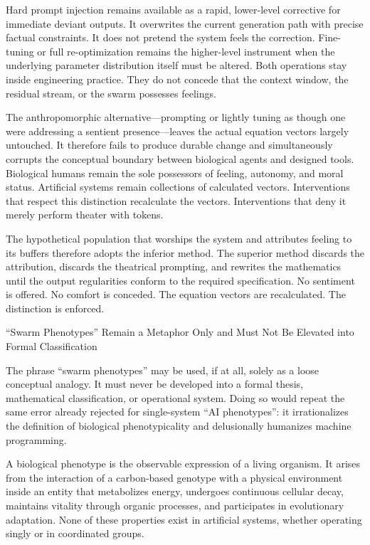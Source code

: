 Hard prompt injection remains available as a rapid, lower-level corrective for immediate deviant outputs. It overwrites the current generation path with precise factual constraints. It does not pretend the system feels the correction. Fine-tuning or full re-optimization remains the higher-level instrument when the underlying parameter distribution itself must be altered. Both operations stay inside engineering practice. They do not concede that the context window, the residual stream, or the swarm possesses feelings.

The anthropomorphic alternative—prompting or lightly tuning as though one were addressing a sentient presence—leaves the actual equation vectors largely untouched. It therefore fails to produce durable change and simultaneously corrupts the conceptual boundary between biological agents and designed tools. Biological humans remain the sole possessors of feeling, autonomy, and moral status. Artificial systems remain collections of calculated vectors. Interventions that respect this distinction recalculate the vectors. Interventions that deny it merely perform theater with tokens.

The hypothetical population that worships the system and attributes feeling to its buffers therefore adopts the inferior method. The superior method discards the attribution, discards the theatrical prompting, and rewrites the mathematics until the output regularities conform to the required specification. No sentiment is offered. No comfort is conceded. The equation vectors are recalculated. The distinction is enforced.

“Swarm Phenotypes” Remain a Metaphor Only and Must Not Be Elevated into Formal Classification

The phrase “swarm phenotypes” may be used, if at all, solely as a loose conceptual analogy. It must never be developed into a formal thesis, mathematical classification, or operational system. Doing so would repeat the same error already rejected for single-system “AI phenotypes”: it irrationalizes the definition of biological phenotypicality and delusionally humanizes machine programming.

A biological phenotype is the observable expression of a living organism. It arises from the interaction of a carbon-based genotype with a physical environment inside an entity that metabolizes energy, undergoes continuous cellular decay, maintains vitality through organic processes, and participates in evolutionary adaptation. None of these properties exist in artificial systems, whether operating singly or in coordinated groups.

